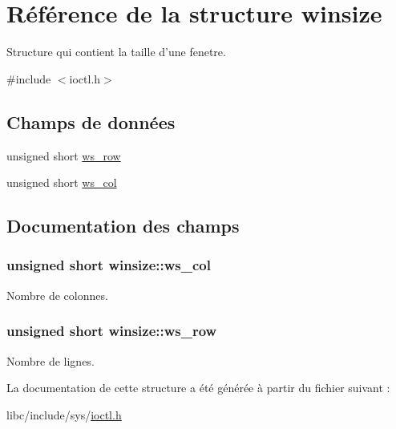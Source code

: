 \hypertarget{structwinsize}{\section{\-Référence de la structure winsize}
\label{structwinsize}
}


\-Structure qui contient la taille d'une fenetre.  




{\ttfamily \#include $<$ioctl.\-h$>$}

\subsection*{\-Champs de données}
\begin{DoxyCompactItemize}
\item 
unsigned short \hyperlink{structwinsize_a73698fa1d966374b0701e4bf225f0141}{ws\-\_\-row}
\item 
unsigned short \hyperlink{structwinsize_a80bedf71a49fd324e0d92d0702cc7005}{ws\-\_\-col}
\end{DoxyCompactItemize}


\subsection{\-Documentation des champs}
\hypertarget{structwinsize_a80bedf71a49fd324e0d92d0702cc7005}{
\subsubsection[{ws\-\_\-col}]{\setlength{\rightskip}{0pt plus 5cm}unsigned short {\bf winsize\-::ws\-\_\-col}}}\label{structwinsize_a80bedf71a49fd324e0d92d0702cc7005}
\-Nombre de colonnes. \hypertarget{structwinsize_a73698fa1d966374b0701e4bf225f0141}{
\subsubsection[{ws\-\_\-row}]{\setlength{\rightskip}{0pt plus 5cm}unsigned short {\bf winsize\-::ws\-\_\-row}}}\label{structwinsize_a73698fa1d966374b0701e4bf225f0141}
\-Nombre de lignes. 

\-La documentation de cette structure a été générée à partir du fichier suivant \-:\begin{DoxyCompactItemize}
\item 
libc/include/sys/\hyperlink{ioctl_8h}{ioctl.\-h}\end{DoxyCompactItemize}
